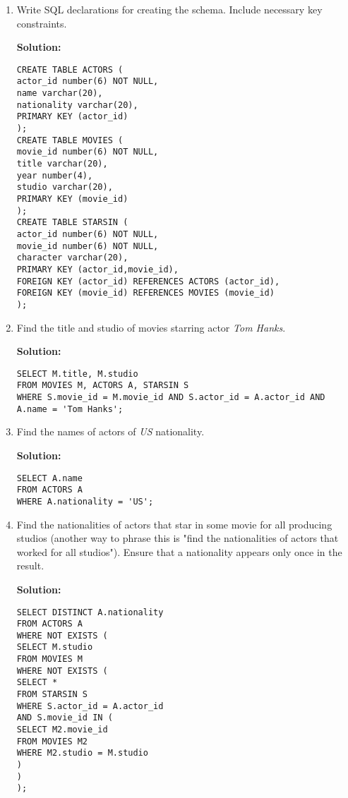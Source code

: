 \begin{enumerate}

\item Write SQL declarations for creating the schema. Include necessary key constraints.

\textbf{Solution:}

\begin{verbatim}
CREATE TABLE ACTORS (
actor_id number(6) NOT NULL,
name varchar(20),
nationality varchar(20),
PRIMARY KEY (actor_id)
);
CREATE TABLE MOVIES (
movie_id number(6) NOT NULL,
title varchar(20),
year number(4),
studio varchar(20),
PRIMARY KEY (movie_id)
);
CREATE TABLE STARSIN (
actor_id number(6) NOT NULL,
movie_id number(6) NOT NULL,
character varchar(20),
PRIMARY KEY (actor_id,movie_id),
FOREIGN KEY (actor_id) REFERENCES ACTORS (actor_id),
FOREIGN KEY (movie_id) REFERENCES MOVIES (movie_id)
);
\end{verbatim}

\item Find the title and studio of movies starring actor \textit{Tom Hanks}.

\textbf{Solution:}

\begin{verbatim}
SELECT M.title, M.studio
FROM MOVIES M, ACTORS A, STARSIN S
WHERE S.movie_id = M.movie_id AND S.actor_id = A.actor_id AND A.name = 'Tom Hanks';
\end{verbatim}

\item Find the names of actors of \textit{US} nationality.

\textbf{Solution:}

\begin{verbatim}
SELECT A.name
FROM ACTORS A
WHERE A.nationality = 'US';
\end{verbatim}

\item Find the nationalities of actors that star in some movie for all producing studios (another way to phrase this is "find the nationalities of actors that worked for all studios"). Ensure that a nationality appears only once in the result.

\textbf{Solution:}

\begin{verbatim}
SELECT DISTINCT A.nationality
FROM ACTORS A
WHERE NOT EXISTS (
SELECT M.studio
FROM MOVIES M
WHERE NOT EXISTS (
SELECT *
FROM STARSIN S
WHERE S.actor_id = A.actor_id 
AND S.movie_id IN (
SELECT M2.movie_id
FROM MOVIES M2
WHERE M2.studio = M.studio
)
)
);
\end{verbatim}


\end{enumerate}

